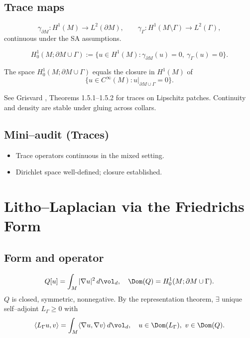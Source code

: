 \subsection{Trace maps}
\[
\gamma_{\partial M}:H^1(M)\to L^2(\partial M),\qquad
\gamma_\Gamma:H^1(M\setminus\Gamma)\to L^2(\Gamma),
\]
continuous under the SA assumptions. 

\begin{definition}
\[
H^1_0(M;\partial M\cup\Gamma)
:=\{u\in H^1(M): \gamma_{\partial M}(u)=0,\ \gamma_\Gamma(u)=0\}.
\]
\end{definition}

\begin{theorem}
\label{thm:trace-density}
The space $H^1_0(M;\partial M\cup\Gamma)$ equals the closure in $H^1(M)$ of 
\[
\{u\in C^\infty(M): u|_{\partial M\cup\Gamma}=0\}.
\]
\end{theorem}

\begin{remark}
See Grisvard \cite{Grisvard1985}, Theorems 1.5.1–1.5.2 for traces on Lipschitz patches. 
Continuity and density are stable under gluing across collars.
\end{remark}

\subsection*{Mini–audit (Traces)}
\begin{itemize}
  \item Trace operators continuous in the mixed setting.
  \item Dirichlet space well-defined; closure established.
\end{itemize}

\section{Litho–Laplacian via the Friedrichs Form}
\label{sec:litho-laplacian-prelim}

\subsection{Form and operator}
\[
Q[u]=\int_M |\nabla u|^2\,d\vol_d,\quad \Dom(Q)=H^1_0(M;\partial M\cup\Gamma).
\]
$Q$ is closed, symmetric, nonnegative. 
By the representation theorem, $\exists$ unique self–adjoint $L_\Gamma\ge0$ with 
\[
\langle L_\Gamma u,v\rangle=\int_M \langle\nabla u,\nabla v\rangle\,d\vol_d,\quad u\in \Dom(L_\Gamma),\ v\in \Dom(Q).
\]


